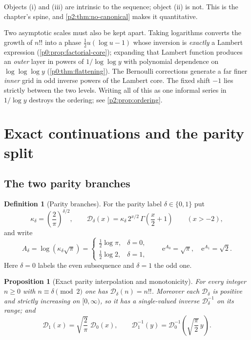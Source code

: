 \documentclass[11pt,a4paper,oneside]{book}
\theoremstyle{plain}
\newtheorem{proposition}[theorem]{Proposition}
\theoremstyle{definition}
\newtheorem{definition}[theorem]{Definition}
\theoremstyle{remark}
\newcommand{\e}{\mathrm{e}}
\begin{document}
Objects (i) and (iii) are intrinsic to the sequence; object (ii) is not.  This
is the chapter's spine, and \cref{p2:thm:no-canonical} makes it quantitative.

Two asymptotic scales must also be kept apart.  Taking logarithms converts the
growth of \(n!!\) into a phase \(\tfrac12 u(\log u-1)\) whose inversion is
\emph{exactly} a Lambert expression (\cref{p0:prop:factorial-core}); expanding
that Lambert function produces an \emph{outer} layer in powers of
\(1/\log\log y\) with polynomial dependence on \(\log\log\log y\)
(\cref{p0:thm:flattening}).  The Bernoulli corrections generate a far finer
\emph{inner} grid in odd inverse powers of the Lambert core.  The fixed shift
\(-1\) lies strictly between the two levels.  Writing all of this as one
informal series in \(1/\log y\) destroys the ordering; see
\cref{p2:prop:ordering}.

\section{Exact continuations and the parity split}
\label{p2:sec:continuations}

\subsection{The two parity branches}

\begin{definition}[Parity branches]
\label{p2:def:branches}
For the parity label \(\delta\in\{0,1\}\) put
\begin{equation}
 \kappa_\delta=\left(\frac2\pi\right)^{\delta/2},
 \qquad
 \mathcal D_\delta(x)=\kappa_\delta\,2^{x/2}\,
 \Gamma\!\left(\frac x2+1\right)
 \qquad(x>-2),
 \label{p2:eq:branches}
\end{equation}
and write
\begin{equation}
 A_\delta=\log\!\left(\kappa_\delta\sqrt\pi\right)
 =\begin{cases}\tfrac12\log\pi,&\delta=0,\\[0.2em]
               \tfrac12\log2,&\delta=1,\end{cases}
 \qquad
 \e^{A_0}=\sqrt\pi,\quad \e^{A_1}=\sqrt2 .
 \label{p2:eq:Adelta}
\end{equation}
Here \(\delta=0\) labels the even subsequence and \(\delta=1\) the odd one.
\end{definition}

\begin{proposition}[Exact parity interpolation and monotonicity]
\label{p2:prop:branch-interp}
For every integer \(n\ge0\) with \(n\equiv\delta\pmod2\) one has
\(\mathcal D_\delta(n)=n!!\).  Moreover each \(\mathcal D_\delta\) is positive
and strictly increasing on \([0,\infty)\), so it has a single-valued inverse
\(\mathcal D_\delta^{-1}\) on its range; and
\begin{equation}
 \mathcal D_1(x)=\sqrt{\frac2\pi}\;\mathcal D_0(x),
 \qquad
 \mathcal D_1^{-1}(y)=\mathcal D_0^{-1}\!\left(\sqrt{\frac\pi2}\,y\right).
 \label{p2:eq:branch-scaling}
\end{equation}
\end{proposition}
\end{document}
